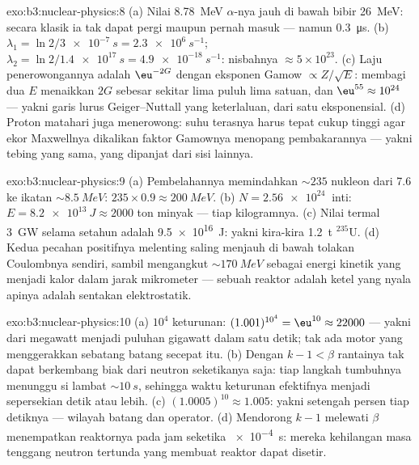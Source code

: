 \begin{solution}{exo:b3:nuclear-physics:8}
(a) Nilai \qty{8.78}{MeV} $\alpha$-nya jauh di bawah bibir
\qty{26}{MeV}: secara klasik ia tak dapat pergi maupun pernah
masuk --- namun  \qty{0.3}{\micro s}. (b)
$\lambda_1 = \ln2/\qty{3e-7}{s} = \qty{2.3e6}{s^{-1}}$;
$\lambda_2 = \ln2/\qty{1.4e17}{s} = \qty{4.9e-18}{s^{-1}}$:
nisbahnya $\approx 5\times10^{23}$. (c) Laju penerowongannya adalah
$\eu^{-2G}$ dengan eksponen Gamow $\propto Z/\sqrt E$:
membagi dua $E$ menaikkan $2G$ sebesar sekitar lima puluh lima satuan, dan
$\eu^{55} \approx 10^{24}$ --- yakni garis lurus Geiger--Nuttall yang
keterlaluan, dari satu eksponensial. (d) Proton matahari juga
menerowong: suhu terasnya harus tepat cukup tinggi agar
ekor Maxwellnya dikalikan faktor Gamownya menopang pembakarannya ---
yakni tebing yang sama, yang dipanjat dari sisi lainnya.
\end{solution}

\begin{solution}{exo:b3:nuclear-physics:9}
(a) Pembelahannya memindahkan ${\sim}235$ nukleon dari \qty{7.6}{} ke
ikatan ${\sim}\qty{8.5}{MeV}$: $235\times0.9 \approx
\qty{200}{MeV}$. (b) $N = \qty{2.56e24}{}$ inti:
$E = \qty{8.2e13}{J} \approx 2000$ ton minyak --- tiap
kilogramnya. (c) Nilai termal \qty{3}{GW} selama setahun adalah
\qty{9.5e16}{J}: yakni kira-kira \qty{1.2}{t} $^{235}$U. (d) Kedua
pecahan positifnya melenting saling menjauh di bawah tolakan Coulombnya
sendiri, sambil mengangkut ${\sim}\qty{170}{MeV}$ sebagai energi kinetik
yang menjadi kalor dalam jarak mikrometer --- sebuah reaktor adalah ketel
yang nyala apinya adalah sentakan elektrostatik.
\end{solution}

\begin{solution}{exo:b3:nuclear-physics:10}
(a) $10^4$ keturunan: $(1.001)^{10^4} = \eu^{10} \approx
22000$ --- yakni dari megawatt menjadi puluhan gigawatt dalam satu detik; tak ada
motor yang menggerakkan sebatang batang secepat itu. (b) Dengan $k - 1 < \beta$ rantainya
tak dapat berkembang biak dari neutron seketikanya saja: tiap langkah tumbuhnya
menunggu si lambat ${\sim}\qty{10}{s}$, sehingga waktu
keturunan efektifnya menjadi sepersekian detik atau lebih. (c)
$(1.0005)^{10} \approx 1.005$: yakni setengah persen tiap detiknya ---
wilayah batang dan operator. (d) Mendorong $k - 1$ melewati $\beta$
menempatkan reaktornya pada jam seketika \qty{e-4}{s}: mereka kehilangan
masa tenggang neutron tertunda yang membuat reaktor dapat disetir.
\end{solution}

